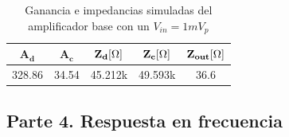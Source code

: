 \begin{enumerate}
        \begin{table}[H]
          \centering
          \begin{tabular}{|c|c|c|c|c|}
            \hline
            $\mathbf{A_d}$ & $\mathbf{A_c}$ & $\mathbf{Z_{d}[\ohm]}$ & $\mathbf{Z_{c}[\ohm]}$ & $\mathbf{Z_{out} [\ohm]}$ \\ \hline
            328.86         & 34.54          & 45.212k                & 49.593k                & 36.6                      \\ \hline
          \end{tabular}
          \caption{Ganancia e impedancias simuladas del amplificador base con un $V_{in}=1mV_p$}
          \label{tab:dinamico_base_sim1m}
        \end{table}

\end{enumerate}


\subsection{Parte 4. Respuesta en frecuencia}

